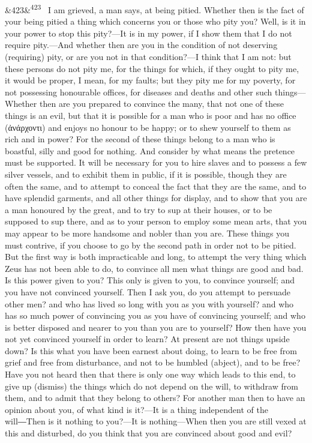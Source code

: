 \documentclass[12pt]{article}
\newcommand{\para}[1][]{\par\noindent\ifx&#1&\else\textsuperscript{\footnotesize #1}~\fi}
\begin{document}
\para[423] I am grieved, a man says, at being pitied. Whether then is the fact of your being pitied a thing which concerns you or those who pity you? Well, is it in your power to stop this pity?—It is in my power, if I show them that I do not require pity.—And whether then are you in the condition of not deserving (requiring) pity, or are you not in that condition?—I think that I am not: but these persons do not pity me, for the things for which, if they ought to pity me, it would be proper, I mean, for my faults; but they pity me for my poverty, for not possessing honourable offices, for diseases and deaths and other such things—Whether then are you prepared to convince the many, that not one of these things is an evil, but that it is possible for a man who is poor and has no office (ἀνάρχοντι) and enjoys no honour to be happy; or to shew yourself to them as rich and in power? For the second of these things belong to a man who is boastful, silly and good for nothing. And consider by what means the pretence must be supported. It will be necessary for you to hire slaves and to possess a few silver vessels, and to exhibit them in public, if it is possible, though they are often the same, and to attempt to conceal the fact that they are the same, and to have splendid garments, and all other things for display, and to show that you are a man honoured by the great, and to try to sup at their houses, or to be supposed to sup there, and as to your person to employ some mean arts, that you may appear to be more handsome and nobler than you are. These things you must contrive, if you choose to go by the second path in order not to be pitied. But the first way is both impracticable and long, to attempt the very thing which Zeus has not been able to do, to convince all men what things are good and bad. Is this power given to you? This only is given to you, to convince yourself; and you have not convinced yourself. Then I ask you, do you attempt to persuade other men? and who has lived so long with you as you with yourself? and who has so much power of convincing you as you have of convincing yourself; and who is better disposed and nearer to you than you are to yourself? How then have you not yet convinced yourself in order to learn? At present are not things upside down? Is this what you have been earnest about doing, to learn to be free from grief and free from disturbance, and not to be humbled (abject), and to be free? Have you not heard then that there is only one way which leads to this end, to give up (dismiss) the things which do not depend on the will, to withdraw from them, and to admit that they belong to others? For another man then to have an opinion about you, of what kind is it?—It is a thing independent of the will―Then is it nothing to you?—It is nothing—When then you are still vexed at this and disturbed, do you think that you are convinced about good and evil?
\end{document}
